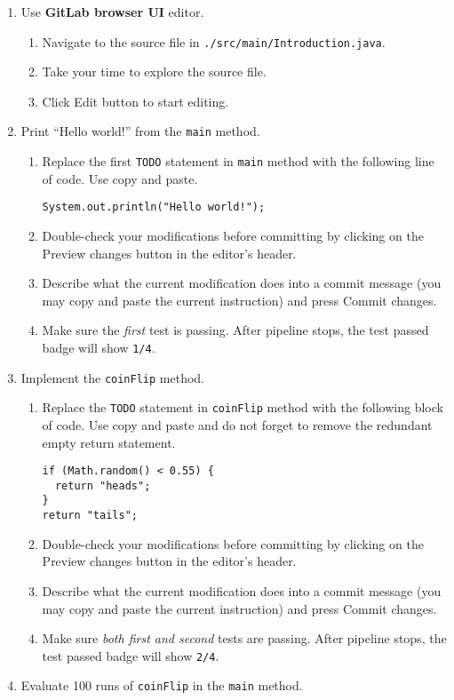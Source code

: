 \begin{enumerate}
\def\labelenumi{\arabic{enumi}.}
\item
  Use \textbf{GitLab browser UI} editor.

  \begin{enumerate}
  \def\labelenumii{\arabic{enumii}.}
  \item
    Navigate to the source file in \texttt{./src/main/Introduction.java}.
  \item
    Take your time to explore the source file.
  \item
    Click Edit button to start editing.
  \end{enumerate}
\item
  Print ``Hello world!'' from the \texttt{main} method.

  \begin{enumerate}
  \def\labelenumii{\arabic{enumii}.}
  \item
    Replace the first \texttt{TODO} statement in \texttt{main} method with the following line of code. Use copy and paste.

\begin{verbatim}
System.out.println("Hello world!");
\end{verbatim}
  \item
    Double-check your modifications before committing by clicking on the Preview changes button in the editor's header.
  \item
    Describe what the current modification does into a commit message (you may copy and paste the current instruction) and press Commit changes.
  \item
    Make sure the \emph{first} test is passing. After pipeline stops, the test passed badge will show \texttt{1/4}.
  \end{enumerate}
\item
  Implement the \texttt{coinFlip} method.

  \begin{enumerate}
  \def\labelenumii{\arabic{enumii}.}
  \item
    Replace the \texttt{TODO} statement in \texttt{coinFlip} method with the following block of code. Use copy and paste and do not forget to remove the redundant empty return statement.

\begin{verbatim}
if (Math.random() < 0.55) {
  return "heads";
}
return "tails";
\end{verbatim}
  \item
    Double-check your modifications before committing by clicking on the Preview changes button in the editor's header.
  \item
    Describe what the current modification does into a commit message (you may copy and paste the current instruction) and press Commit changes.
  \item
    Make sure \emph{both first and second} tests are passing. After pipeline stops, the test passed badge will show \texttt{2/4}.
  \end{enumerate}
\item
  Evaluate 100 runs of \texttt{coinFlip} in the \texttt{main} method.


\end{enumerate}
